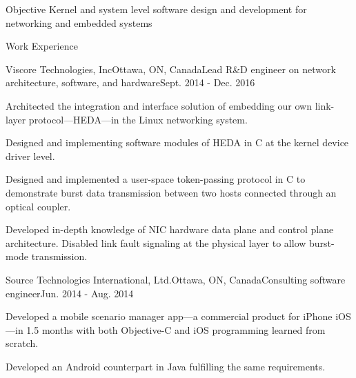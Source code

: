 \documentclass{resume} %
\begin{document}

\begin{rSection}{Objective}
Kernel and system level software design and development for networking and embedded systems
\end{rSection}


\begin{rSection}{Work Experience}

\begin{rSubsection}{Viscore Technologies, Inc}{Ottawa, ON, Canada}{Lead R\&D engineer on network architecture, software, and hardware}{Sept. 2014 - Dec. 2016}
\item Architected the integration and interface solution of embedding our own link-layer protocol---HEDA---in the Linux networking system.
\item Designed and implementing software modules of HEDA in C at the kernel device driver level.
\item Designed and implemented a user-space token-passing protocol in C to demonstrate burst data transmission between two hosts connected through an optical coupler.
\item Developed in-depth knowledge of NIC hardware data plane and control plane architecture. Disabled link fault signaling at the physical layer to allow burst-mode transmission.
\end{rSubsection}


\begin{rSubsection}{Source Technologies International, Ltd.}{Ottawa, ON, Canada}{Consulting software engineer}{Jun. 2014 - Aug. 2014}
\item Developed a mobile scenario manager app---a commercial product for iPhone iOS---in 1.5 months with both Objective-C and iOS programming learned from scratch.
\item Developed an Android counterpart in Java fulfilling the same requirements.
\end{rSubsection}

\end{rSection}
\end{document}
